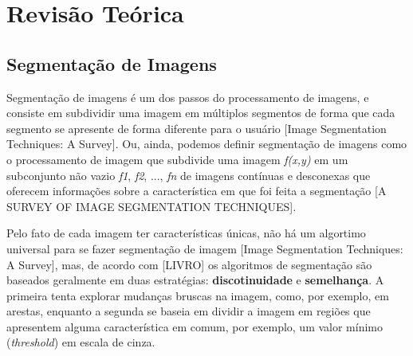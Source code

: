 \section{Revisão Teórica}
\subsection{Segmentação de Imagens}

Segmentação de imagens é um dos passos do processamento de imagens, e consiste em subdividir uma imagem em múltiplos segmentos de forma que cada segmento se apresente de forma diferente para o usuário [Image Segmentation Techniques: A Survey]. Ou, ainda, podemos definir segmentação de imagens como o processamento de imagem que subdivide uma imagem \textit{f(x,y)} em um subconjunto não vazio \textit{f1}, \textit{f2}, ..., \textit{fn} de imagens contínuas e desconexas que oferecem informações sobre a característica em que foi feita a segmentação [A SURVEY OF IMAGE SEGMENTATION TECHNIQUES].

Pelo fato de cada imagem ter características únicas, não há um algortimo universal para se fazer segmentação de imagem [Image Segmentation Techniques: A Survey], mas, de acordo com [LIVRO] os algoritmos de segmentação são baseados geralmente em duas estratégias: \textbf{discotinuidade} e \textbf{semelhança}. A primeira tenta explorar mudanças bruscas na imagem, como, por exemplo, em arestas, enquanto a segunda se baseia em dividir a imagem em regiões que apresentem alguma característica em comum, por exemplo, um valor mínimo (\textit{threshold}) em escala de cinza.